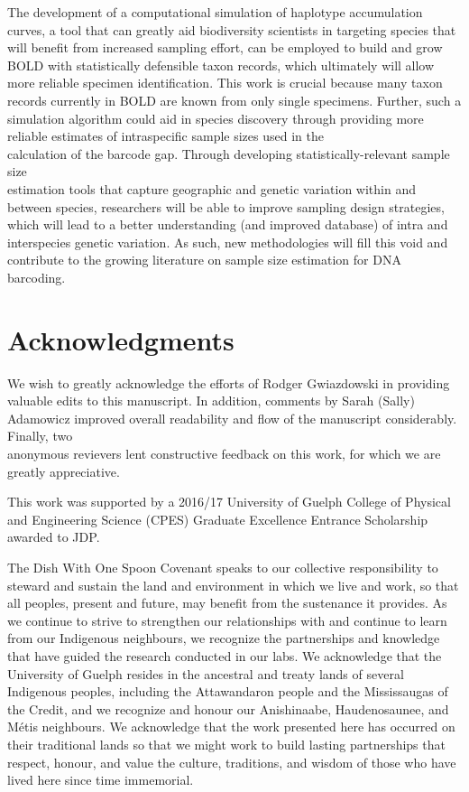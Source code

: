 The development of a computational simulation of haplotype accumulation curves, a tool that can greatly aid biodiversity scientists in targeting species that will benefit from increased sampling effort, can be employed to build and grow BOLD with statistically defensible taxon records, which ultimately will allow more reliable specimen identification. This work is crucial because many taxon records currently in BOLD are known from only single specimens. Further, such a simulation algorithm could aid in species discovery through providing more reliable estimates of intraspecific sample sizes used in the \\ calculation of the barcode gap. Through developing statistically-relevant sample size \\ estimation tools that capture geographic and genetic variation within and between species, researchers will be able to improve sampling design strategies, which will lead to a better understanding (and improved database) of intra and interspecies genetic variation. As such, new methodologies will fill this void and contribute to the growing literature on sample size estimation for DNA barcoding.

\newpage

\section*{Acknowledgments}

We wish to greatly acknowledge the efforts of Rodger Gwiazdowski in providing \\ valuable edits to this manuscript. In addition, comments by Sarah (Sally) Adamowicz improved overall readability and flow of the manuscript considerably. Finally, two \\ anonymous revievers lent constructive feedback on this work, for which we are greatly appreciative.



This work was supported by a 2016/17 University of Guelph College of Physical and Engineering Science (CPES) Graduate Excellence Entrance Scholarship awarded to JDP.



The Dish With One Spoon Covenant speaks to our collective responsibility to steward and sustain the land and environment in which we live and work, so that all peoples, present and future, may benefit from the sustenance it provides. As we continue to strive to strengthen our relationships with and continue to learn from our Indigenous neighbours, we recognize the partnerships and knowledge that have guided the research conducted in our labs. We acknowledge that the University of Guelph resides in the ancestral and treaty lands of several Indigenous peoples, including the Attawandaron people and the Mississaugas of the Credit, and we recognize and honour our Anishinaabe, Haudenosaunee, and M{\'e}tis neighbours. We acknowledge that the work presented here has occurred on their traditional lands so that we might work to build lasting partnerships that respect, honour, and value the culture, traditions, and wisdom of those who have lived here since time immemorial.



